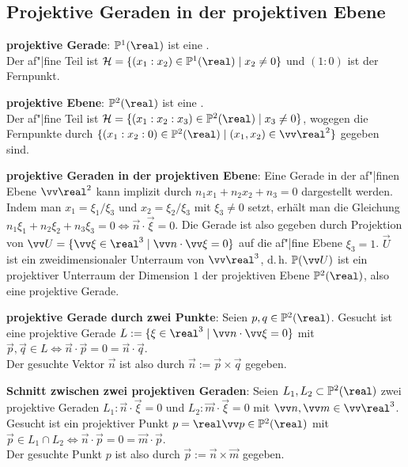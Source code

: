 \pagebreak

\subsection{%
    Projektive Geraden in der projektiven Ebene%
}

\textbf{projektive Gerade}:
$\PP^1(\real)$ ist eine .\\
Der af"|fine Teil ist $\H = \{(x_1 : x_2) \in \PP^1(\real) \;|\; x_2 \not= 0\}$
und $(1 : 0)$ ist der Fernpunkt.

\textbf{projektive Ebene}:
$\PP^2(\real)$ ist eine .\\
Der af"|fine Teil ist $\H = \{(x_1 : x_2 : x_3) \in \PP^2(\real) \;|\; x_3 \not= 0\}$,
wogegen die Fernpunkte durch $\{(x_1 : x_2 : 0) \in \PP^2(\real) \;|\;
(x_1, x_2) \in \vec{\real}^2\}$ gegeben sind.

\linie

\textbf{projektive Geraden in der projektiven Ebene}:
Eine Gerade in der af"|finen Ebene $\vec{\real}^2$ kann implizit durch
$n_1x_1 + n_2x_2 + n_3 = 0$ dargestellt werden.
Indem man $x_1 = \xi_1/\xi_3$ und $x_2 = \xi_2/\xi_3$ mit $\xi_3 \not= 0$ setzt,
erhält man die Gleichung $n_1 \xi_1 + n_2 \xi_2 + n_3 \xi_3 = 0 \iff \vec{n} \cdot \vec{\xi} = 0$.
Die Gerade ist also gegeben durch Projektion von
$\vec{U} = \{\vec{\xi} \in \real^3 \;|\; \vec{n} \cdot \vec{\xi} = 0\}$
auf die af"|fine Ebene $\xi_3 = 1$.
$\vec{U}$ ist ein zweidimensionaler Unterraum von $\vec{\real}^3$, d.\,h.
$\PP(\vec{U})$ ist ein projektiver Unterraum der Dimension $1$
der projektiven Ebene $\PP^2(\real)$, also eine projektive Gerade.

\linie

\textbf{projektive Gerade durch zwei Punkte}:
Seien $p, q \in \PP^2(\real)$.
Gesucht ist eine projektive Gerade $L := \{\xi \in \real^3 \;|\; \vec{n} \cdot \vec{\xi} = 0\}$
mit $\vec{p}, \vec{q} \in L \iff \vec{n} \cdot \vec{p} = 0 = \vec{n} \cdot \vec{q}$.\\
Der gesuchte Vektor $\vec{n}$ ist also durch $\vec{n} := \vec{p} \times \vec{q}$ gegeben.

\textbf{Schnitt zwischen zwei projektiven Geraden}:
Seien $L_1, L_2 \subset \PP^2(\real)$ zwei projektive Geraden
$L_1\colon \vec{n} \cdot \vec{\xi} = 0$ und $L_2\colon \vec{m} \cdot \vec{\xi} = 0$ mit
$\vec{n}, \vec{m} \in \vec{\real}^3$.
Gesucht ist ein projektiver Punkt $p = \real\vec{p} \in \PP^2(\real)$ mit $\vec{p} \in L_1 \cap L_2
\iff \vec{n} \cdot \vec{p} = 0 = \vec{m} \cdot \vec{p}$.\\
Der gesuchte Punkt $p$ ist also durch $\vec{p} := \vec{n} \times \vec{m}$ gegeben.

